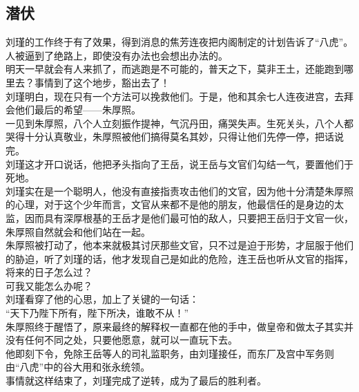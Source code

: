 \begin{multicols}{\theparacolNo}
\subsection{潜伏}
刘瑾的工作终于有了效果，得到消息的焦芳连夜把内阁制定的计划告诉了“八虎”。\\

人被逼到了绝路上，即使没有办法也会想出办法的。\\

明天一早就会有人来抓了，而逃跑是不可能的，普天之下，莫非王土，还能跑到哪里去？事情到了这个地步，豁出去了！\\

刘瑾明白，现在只有一个方法可以挽救他们。于是，他和其余七人连夜进宫，去拜会他们最后的希望——朱厚照。\\

一见到朱厚照，八个人立刻振作提神，气沉丹田，痛哭失声。生死关头，八个人都哭得十分认真敬业，朱厚照被他们搞得莫名其妙，只得让他们先停一停，把话说完。\\

刘瑾这才开口说话，他把矛头指向了王岳，说王岳与文官们勾结一气，要置他们于死地。\\

刘瑾实在是一个聪明人，他没有直接指责攻击他们的文官，因为他十分清楚朱厚照的心理，对于这个少年而言，文官从来都不是他的朋友，他最信任的是身边的太监，因而具有深厚根基的王岳才是他们最可怕的敌人，只要把王岳归于文官一伙，朱厚照自然就会和他们站在一起。\\

朱厚照被打动了，他本来就极其讨厌那些文官，只不过是迫于形势，才屈服于他们的胁迫，听了刘瑾的话，他才发现自己是如此的危险，连王岳也听从文官的指挥，将来的日子怎么过？\\

可我又能怎么办呢？\\

刘瑾看穿了他的心思，加上了关键的一句话：\\

“天下乃陛下所有，陛下所决，谁敢不从！”\\

朱厚照终于醒悟了，原来最终的解释权一直都在他的手中，做皇帝和做太子其实并没有任何不同之处，只要他愿意，就可以一直玩下去。\\

他即刻下令，免除王岳等人的司礼监职务，由刘瑾接任，而东厂及宫中军务则由“八虎”中的谷大用和张永统领。\\

事情就这样结束了，刘瑾完成了逆转，成为了最后的胜利者。\\


\end{multicols}
